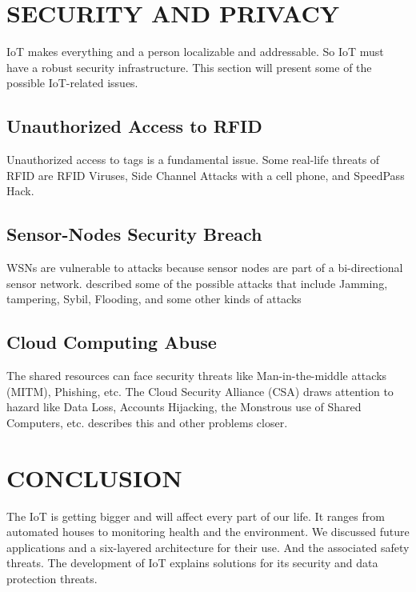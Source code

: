\documentclass[twoside,twocolumn]{article}
\begin{document}
\section{SECURITY AND PRIVACY}
    \noindent IoT makes everything and a person localizable and addressable. So IoT must have a robust security infrastructure. This section will present some of the possible IoT-related issues.
    \subsection{Unauthorized Access to RFID}
        \noindent Unauthorized access to tags is a fundamental issue. Some real-life threats of RFID are RFID Viruses, Side Channel Attacks with a cell phone, and SpeedPass Hack.
    \subsection{ Sensor-Nodes Security Breach}
        \noindent WSNs are vulnerable to attacks because sensor nodes are part of a bi-directional sensor network. \cite{SecurityIssuesWireless} described some of the possible attacks that include Jamming, tampering, Sybil, Flooding, and some other kinds of attacks
    \subsection{Cloud Computing Abuse}
        \noindent The shared resources can face security threats like Man-in-the-middle attacks (MITM), Phishing, etc. The Cloud Security Alliance (CSA) draws attention to hazard like Data Loss, Accounts Hijacking, the Monstrous use of Shared Computers, etc. \cite{SecurityCloudComputing} describes this and other problems closer.
        
\section{CONCLUSION}
    \noindent The IoT is getting bigger and will affect every part of our life. It ranges from automated houses to monitoring health and the environment. We discussed future applications and a six-layered architecture for their use. And the associated safety threats. The development of IoT explains solutions for its security and data protection threats.

    
    {\footnotesize
    }
\end{document}
